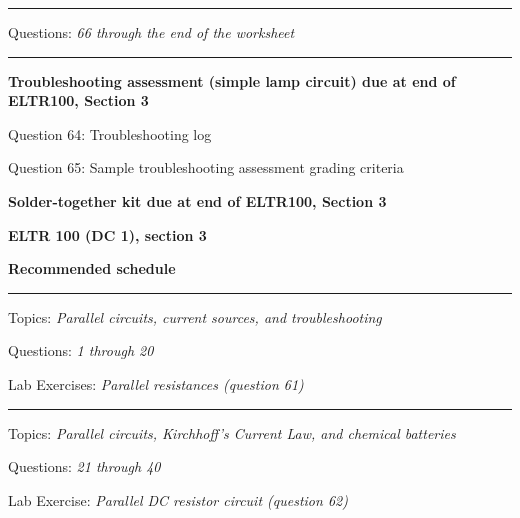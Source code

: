 \vskip 10pt
\hrule \vskip 5pt
\noindent
{}

\hskip 10pt Questions: {\it 66 through the end of the worksheet}
 
\vskip 10pt
\hrule \vskip 5pt
\noindent
{}

\hskip 10pt {\bf Troubleshooting assessment (simple lamp circuit) due at end of ELTR100, Section 3}
 
\hskip 10pt Question 64: Troubleshooting log
 
\hskip 10pt Question 65: Sample troubleshooting assessment grading criteria
 
\hskip 10pt {\bf Solder-together kit due at end of ELTR100, Section 3}

\vskip 10pt




\vfil \eject

\centerline{\bf ELTR 100 (DC 1), section 3} \bigskip 
 
\vskip 10pt

\noindent
{\bf Recommended schedule}

\vskip 5pt

\hrule \vskip 5pt
\noindent
{}

\hskip 10pt Topics: {\it Parallel circuits, current sources, and troubleshooting}
 
\hskip 10pt Questions: {\it 1 through 20}
 
\hskip 10pt Lab Exercises: {\it Parallel resistances (question 61)}
 

\vskip 10pt
\hrule \vskip 5pt
\noindent
{}

\hskip 10pt Topics: {\it Parallel circuits, Kirchhoff's Current Law, and chemical batteries}
 
\hskip 10pt Questions: {\it 21 through 40}
 
\hskip 10pt Lab Exercise: {\it Parallel DC resistor circuit (question 62)}
 


